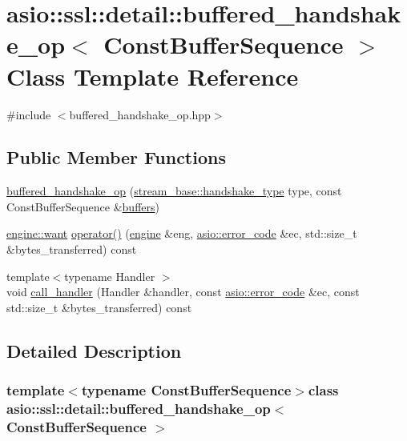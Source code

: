 \hypertarget{classasio_1_1ssl_1_1detail_1_1buffered__handshake__op}{}\section{asio\+:\+:ssl\+:\+:detail\+:\+:buffered\+\_\+handshake\+\_\+op$<$ Const\+Buffer\+Sequence $>$ Class Template Reference}
\label{classasio_1_1ssl_1_1detail_1_1buffered__handshake__op}


{\ttfamily \#include $<$buffered\+\_\+handshake\+\_\+op.\+hpp$>$}

\subsection*{Public Member Functions}
\begin{DoxyCompactItemize}
\item 
\hyperlink{classasio_1_1ssl_1_1detail_1_1buffered__handshake__op_ae835b9479c097d829bebad90a6ae130f}{buffered\+\_\+handshake\+\_\+op} (\hyperlink{classasio_1_1ssl_1_1stream__base_a2f18813d3860bc8aee99249834d7c320}{stream\+\_\+base\+::handshake\+\_\+type} type, const Const\+Buffer\+Sequence \&\hyperlink{group__async__read_ga54dede45c3175148a77fe6635222c47d}{buffers})
\item 
\hyperlink{classasio_1_1ssl_1_1detail_1_1engine_ab9812153941a6a93c9095f4e5ca8f915}{engine\+::want} \hyperlink{classasio_1_1ssl_1_1detail_1_1buffered__handshake__op_af2df0903bf007cd13b16f1cc6238edd6}{operator()} (\hyperlink{classasio_1_1ssl_1_1detail_1_1engine}{engine} \&eng, \hyperlink{classasio_1_1error__code}{asio\+::error\+\_\+code} \&ec, std\+::size\+\_\+t \&bytes\+\_\+transferred) const 
\item 
{\footnotesize template$<$typename Handler $>$ }\\void \hyperlink{classasio_1_1ssl_1_1detail_1_1buffered__handshake__op_ae92797920b5264265725521e08cc746b}{call\+\_\+handler} (Handler \&handler, const \hyperlink{classasio_1_1error__code}{asio\+::error\+\_\+code} \&ec, const std\+::size\+\_\+t \&bytes\+\_\+transferred) const 
\end{DoxyCompactItemize}


\subsection{Detailed Description}
\subsubsection*{template$<$typename Const\+Buffer\+Sequence$>$class asio\+::ssl\+::detail\+::buffered\+\_\+handshake\+\_\+op$<$ Const\+Buffer\+Sequence $>$}



